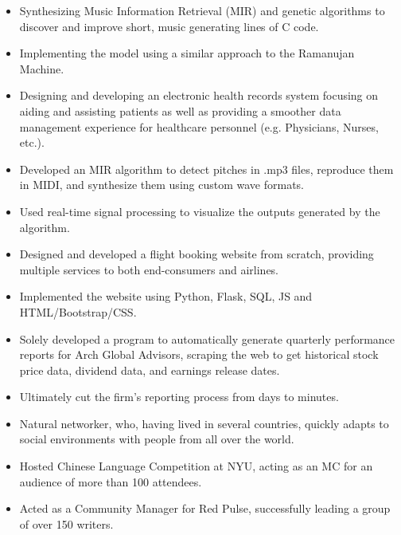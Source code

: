 \begin{itemize}
\item Synthesizing Music Information Retrieval (MIR) and genetic algorithms to discover and improve short, music generating lines of C code.
\item Implementing the model using a similar approach to the Ramanujan Machine.
\end{itemize}
\smallskip
{}
\begin{itemize}
\item Designing and developing an electronic health records system focusing on aiding and assisting patients as well as providing a smoother data management experience for healthcare personnel (e.g. Physicians, Nurses, etc.).
\end{itemize}
\smallskip
{}
\begin{itemize}
\item Developed an MIR algorithm to detect pitches in .mp3 files, reproduce them in MIDI, and synthesize them using custom wave formats.
\item Used real-time signal processing to visualize the outputs generated by the algorithm.
\end{itemize}
\smallskip
{}
\begin{itemize}
\item Designed and developed a flight booking website from scratch, providing multiple services to both end-consumers and airlines.
\item Implemented the website using Python, Flask, SQL, JS and HTML/Bootstrap/CSS.
\end{itemize}
\smallskip
{}
\begin{itemize}
\item Solely developed a program to automatically generate quarterly performance reports for Arch Global Advisors, scraping the web to get historical stock price data, dividend data, and earnings release dates.
\item Ultimately cut the firm's reporting process from days to minutes.
\end{itemize}

\begin{itemize}
\item Natural networker, who, having lived in several countries, quickly adapts to social environments with people from all over the world.
\item Hosted Chinese Language Competition at NYU, acting as an MC for an audience of more than 100 attendees.
\item Acted as a Community Manager for Red Pulse, successfully leading a group of over 150 writers.

\end{itemize}

\cvproject{}